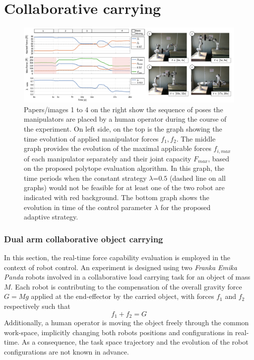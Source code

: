 
\chapter{Collaborative carrying}

\begin{figure}[!t]
    \centering
    \includegraphics[width=\linewidth]{Papers/images/dual-manip-6.pdf}
    \caption{Papers/images 1 to 4 on the right show the sequence of poses the manipulators are placed by a human operator during the course of the experiment. On left side, on the top is the graph showing the time evolution of applied manipulator forces $f_1,f_2$. The middle graph provides the evolution of the maximal applicable forces $f_{i,max}$ of each manipulator separately and their joint capacity $F_{max}$, based on the proposed polytope evaluation algorithm. In this graph,  the time periods when the constant strategy $\lambda$=$0.5$ (dashed line on all graphs) would not be feasible for at least one of the two robot are indicated with red background. The bottom graph shows the  evolution in time of the control parameter $\lambda$ for the proposed adaptive strategy.}
    \label{fig:dual_manip}
    \vspace*{-0.3cm}
\end{figure}


\subsection{Dual arm collaborative object carrying}\label{sec:colaborative_handling}

In this section, the real-time force capability evaluation is employed in the context of robot control. An experiment is designed using two \textit{Franka Emika Panda} robots involved in a collaborative load carrying task for an object of mass $M$. Each robot is contributing to the compensation of the overall gravity force $G=Mg$ applied at the end-effector by the carried object, with forces $f_1$ and $f_2$ respectively such that
\begin{equation}
    f_1 + f_2 = G
\end{equation}
Additionally, a human operator is moving the object freely through the common work-space, implicitly changing both robots positions and configurations in real-time. As a consequence, the task space trajectory and the evolution of the robot configurations are not known in advance.

